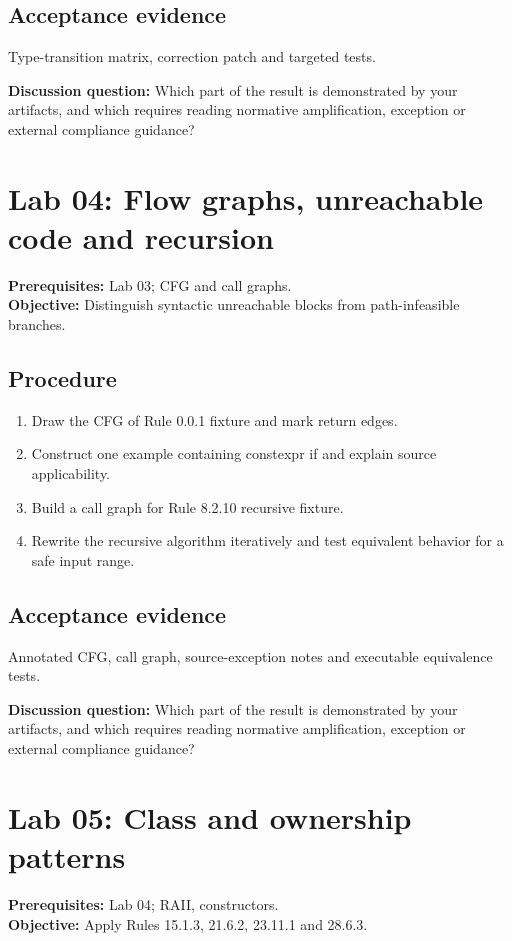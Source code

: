 \documentclass[10pt,letterpaper]{article}
\begin{document}
\subsection{Acceptance evidence}
Type-transition matrix, correction patch and targeted tests.

\textbf{Discussion question:} Which part of the result is demonstrated by your artifacts, and which requires reading normative amplification, exception or external compliance guidance?\par

\section{Lab 04: Flow graphs, unreachable code and recursion}
\textbf{Prerequisites:} Lab 03; CFG and call graphs.\\\textbf{Objective:} Distinguish syntactic unreachable blocks from path-infeasible branches.

\subsection{Procedure}
\begin{enumerate}
\item Draw the CFG of Rule 0.0.1 fixture and mark return edges.
\item Construct one example containing constexpr if and explain source applicability.
\item Build a call graph for Rule 8.2.10 recursive fixture.
\item Rewrite the recursive algorithm iteratively and test equivalent behavior for a safe input range.
\end{enumerate}

\subsection{Acceptance evidence}
Annotated CFG, call graph, source-exception notes and executable equivalence tests.

\textbf{Discussion question:} Which part of the result is demonstrated by your artifacts, and which requires reading normative amplification, exception or external compliance guidance?\par

\section{Lab 05: Class and ownership patterns}
\textbf{Prerequisites:} Lab 04; RAII, constructors.\\\textbf{Objective:} Apply Rules 15.1.3, 21.6.2, 23.11.1 and 28.6.3.
\end{document}
